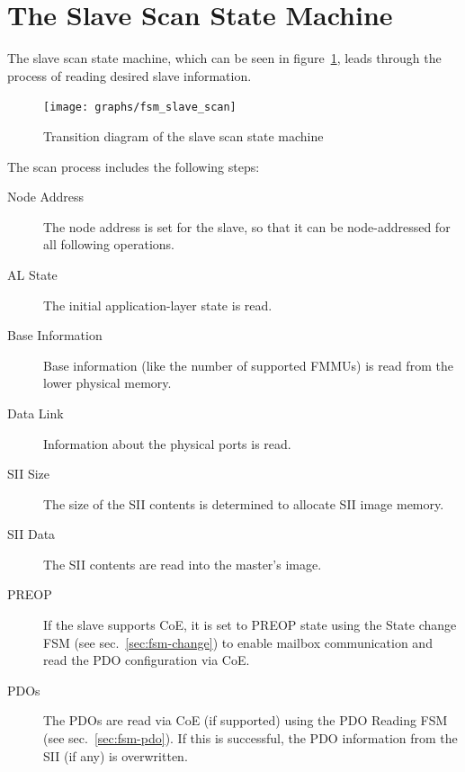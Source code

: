 \documentclass[a4paper,12pt,BCOR6mm,bibtotoc,idxtotoc]{scrbook}
\begin{document}
\section{The Slave Scan State Machine}
\label{sec:fsm-scan}

The slave scan state machine, which can be seen in
figure~\ref{fig:fsm-slavescan}, leads through the process of reading desired
slave information.

\begin{figure}[htbp]
  \centering
  \texttt{[image: graphs/fsm\_slave\_scan]}
  \caption{Transition diagram of the slave scan state machine}
  \label{fig:fsm-slavescan}
\end{figure}

The scan process includes the following steps:

\begin{description}

\item[Node Address] The node address is set for the slave, so that it can be
node-addressed for all following operations.

\item[AL State] The initial application-layer state is read.

\item[Base Information] Base information (like the number of supported FMMUs)
is read from the lower physical memory.

\item[Data Link] Information about the physical ports is read.

\item[SII Size] The size of the SII contents is determined to allocate SII
image memory.

\item[SII Data] The SII contents are read into the master's image.

\item[PREOP] If the slave supports CoE, it is set to PREOP state using the
State change FSM (see sec.~\ref{sec:fsm-change}) to enable mailbox
communication and read the PDO configuration via CoE.

\item[PDOs] The PDOs are read via CoE (if supported) using the PDO Reading FSM
(see sec.~\ref{sec:fsm-pdo}). If this is successful, the PDO information from
the SII (if any) is overwritten.

\end{description}
\end{document}

